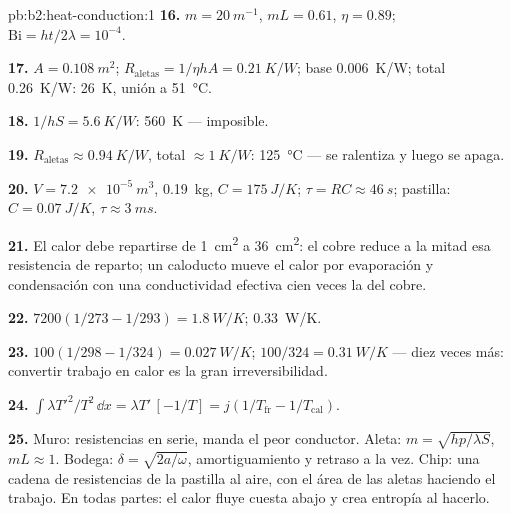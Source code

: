 \begin{solution}{pb:b2:heat-conduction:1}
\textbf{16.} $m = \qty{20}{m^{-1}}$, $mL = 0.61$, $\eta = 0.89$; $\mathrm{Bi} = ht/2\lambda
= 10^{-4}$.

\textbf{17.} $A = \qty{0.108}{m^2}$; $R_{\text{aletas}} = 1/\eta hA = \qty{0.21}{K/W}$; base
\qty{0.006}{K/W}; total \qty{0.26}{K/W}: \qty{26}{K}, unión a \qty{51}{\celsius}.

\textbf{18.} $1/hS = \qty{5.6}{K/W}$: \qty{560}{K} --- imposible.

\textbf{19.} $R_{\text{aletas}} \approx \qty{0.94}{K/W}$, total $\approx \qty{1}{K/W}$:
\qty{125}{\celsius} --- se ralentiza y luego se apaga.

\textbf{20.} $V = \qty{7.2e-5}{m^3}$, \qty{0.19}{kg}, $C = \qty{175}{J/K}$; $\tau = RC
\approx \qty{46}{s}$; pastilla: $C = \qty{0.07}{J/K}$, $\tau \approx \qty{3}{ms}$.

\textbf{21.} El calor debe repartirse de \qty{1}{cm^2} a \qty{36}{cm^2}: el cobre
reduce a la mitad esa resistencia de reparto; un caloducto mueve el calor por
evaporación y condensación con una conductividad efectiva cien
veces la del cobre.

\textbf{22.} $7200(1/273 - 1/293) = \qty{1.8}{W/K}$; \qty{0.33}{W/K}.

\textbf{23.} $100(1/298 - 1/324) = \qty{0.027}{W/K}$; $100/324 = \qty{0.31}{W/K}$ ---
diez veces más: convertir trabajo en calor es la gran irreversibilidad.

\textbf{24.} $\int\lambda T'^2/T^2\,\dd x = \lambda T'\,[-1/T] = j(1/T_{\text{fr}} -
1/T_{\text{cal}})$.

\textbf{25.} Muro: resistencias en serie, manda el peor conductor.
Aleta: $m = \sqrt{hp/\lambda S}$, $mL \approx 1$. Bodega: $\delta = \sqrt{2a/\omega}$,
amortiguamiento y retraso a la vez. Chip: una cadena de resistencias de la pastilla al
aire, con el área de las aletas haciendo el trabajo. En todas partes: el calor fluye cuesta abajo y
crea entropía al hacerlo.
\end{solution}
